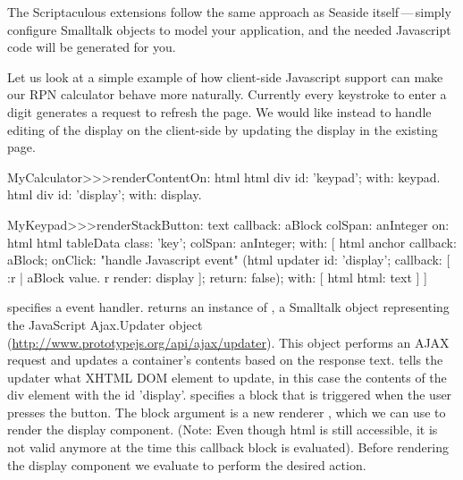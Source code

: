 \documentclass[a4paper,10pt,twoside]{book}
\begin{document}
The Scriptaculous extensions follow the same approach as Seaside itself\,---\,simply configure Smalltalk objects to model your application, and the needed Javascript code will be generated for you.

Let us look at a simple example of how client-side Javascript support can make our RPN calculator behave more naturally.
Currently every keystroke to enter a digit generates a request to refresh the page.
We would like instead to handle editing of the display on the client-side by updating the display in the existing page.


\begin{code}{}
MyCalculator>>>renderContentOn: html
	html div id: 'keypad'; with: keypad.
	html div id: 'display'; with: display.	
\end{code}
				

\begin{code}{}
MyKeypad>>>renderStackButton: text callback: aBlock colSpan: anInteger on: html 
	html tableData
		class: 'key';
		colSpan: anInteger;
		with: [
			html anchor
				callback: aBlock;
				onClick:				"handle Javascript event"
					(html updater
						id: 'display';
						callback: [ :r |
							aBlock value.
							r render: display ];
						return: false);
				with: [ html html: text ] ]
\end{code}

 specifies a  event handler.
 returns an instance of , a Smalltalk object representing the JavaScript Ajax.Updater object (\url{http://www.prototypejs.org/api/ajax/updater}).
This object performs an AJAX request and updates a container's contents based on the response text.
 tells the updater what XHTML DOM element to update, in this case the contents of the div element with the id 'display'.
 specifies a block that is triggered when the user presses the button.
The block argument is a new renderer , which we can use to render the display component.
(Note: Even though html is still accessible, it is not valid anymore at the time this callback block is evaluated).
Before rendering the display component we evaluate  to perform the desired action.
\end{document}
